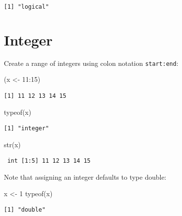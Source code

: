 \documentclass[
]{book}
\newenvironment{Shaded}{\begin{snugshade}}{\end{snugshade}}
\newcommand{\DecValTok}[1]{\textcolor[rgb]{0.00,0.00,0.81}{#1}}
\newcommand{\FunctionTok}[1]{\textcolor[rgb]{0.00,0.00,0.00}{#1}}
\newcommand{\NormalTok}[1]{#1}
\newcommand{\OtherTok}[1]{\textcolor[rgb]{0.56,0.35,0.01}{#1}}
\newcommand{\SpecialCharTok}[1]{\textcolor[rgb]{0.00,0.00,0.00}{#1}}
\begin{document}
\begin{verbatim}
[1] "logical"
\end{verbatim}

\hypertarget{integer}{%
\section{Integer}\label{integer}}

Create a range of integers using colon notation \texttt{start:end}:

\begin{Shaded}
\begin{Highlighting}[]
\NormalTok{(x }\OtherTok{\textless{}{-}} \DecValTok{11}\SpecialCharTok{:}\DecValTok{15}\NormalTok{)}
\end{Highlighting}
\end{Shaded}

\begin{verbatim}
[1] 11 12 13 14 15
\end{verbatim}

\begin{Shaded}
\begin{Highlighting}[]
\FunctionTok{typeof}\NormalTok{(x)}
\end{Highlighting}
\end{Shaded}

\begin{verbatim}
[1] "integer"
\end{verbatim}

\begin{Shaded}
\begin{Highlighting}[]
\FunctionTok{str}\NormalTok{(x)}
\end{Highlighting}
\end{Shaded}

\begin{verbatim}
 int [1:5] 11 12 13 14 15
\end{verbatim}

Note that assigning an integer defaults to type double:

\begin{Shaded}
\begin{Highlighting}[]
\NormalTok{x }\OtherTok{\textless{}{-}} \DecValTok{1}
\FunctionTok{typeof}\NormalTok{(x)}
\end{Highlighting}
\end{Shaded}

\begin{verbatim}
[1] "double"
\end{verbatim}
\end{document}
